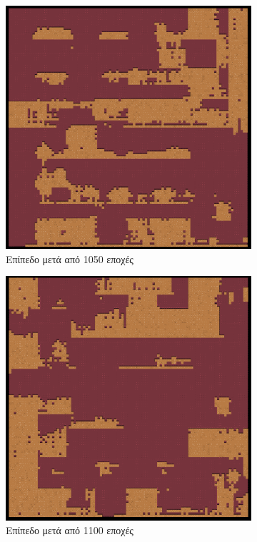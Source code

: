 \begin{figure}[H]
\begin{subfigure}{.5\textwidth}
  \centering
  \includegraphics[width=.8\linewidth]{../images/generated/1050.png}
  \caption{Επίπεδο μετά από 1050 εποχές}
  \label{fig:sfig1}
\end{subfigure}%
\begin{subfigure}{.5\textwidth}
  \centering
  \includegraphics[width=.8\linewidth]{../images/generated/1100.png}
  \caption{Επίπεδο μετά από 1100 εποχές}
  \label{fig:sfig2}
\end{subfigure}
\begin{subfigure}{.5\textwidth}

\end{subfigure}
\end{figure}

